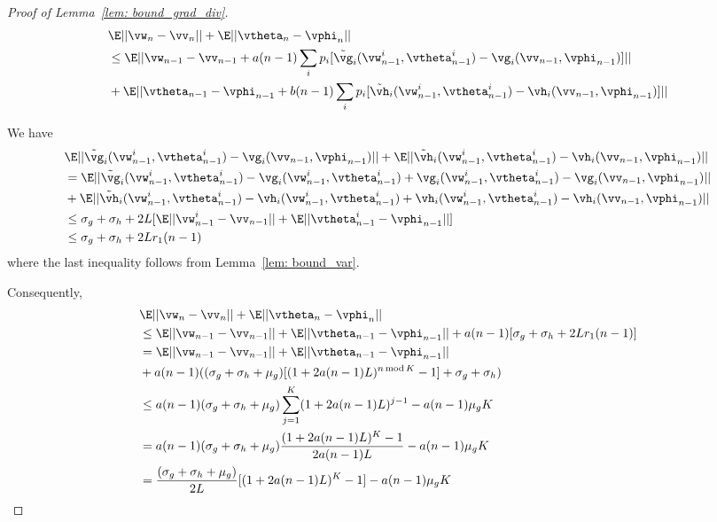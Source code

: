 \documentclass{article}
\def\lemref#1{Lemma~\ref{#1}}
\begin{document}
\begin{proof}[Proof of \lemref{lem: bound_grad_div}]
		\begin{equation}
		\begin{split}
		&\E||{\vw}_{n}-\vv_{n}||+\E||{\vtheta}_{n}-\vphi_{n}||\\
		&\leq \E||{\vw}_{n-1}-\vv_{n-1}+a(n-1)\sum_i p_i [\tilde{\vg}_i(\vw^i_{n-1}, \vtheta^i_{n-1})-\vg_i(\vv_{n-1},\vphi_{n-1})]||\\
		&+ \E||{\vtheta}_{n-1}-\vphi_{n-1}+b(n-1)\sum_i p_i [\tilde{\vh}_i(\vw^i_{n-1}, \vtheta^i_{n-1})-\vh_i(\vv_{n-1},\vphi_{n-1})]||
		\end{split}
		\end{equation}
		
		We have
		\begin{equation}
		\begin{split}
		&\E||\tilde{\vg}_i(\vw^i_{n-1}, \vtheta^i_{n-1})-\vg_i(\vv_{n-1},\vphi_{n-1})||+\E||\tilde{\vh}_i(\vw^i_{n-1}, \vtheta^i_{n-1})-\vh_i(\vv_{n-1},\vphi_{n-1})||\\
		&=\E||\tilde{\vg}_i(\vw^i_{n-1}, \vtheta^i_{n-1})-\vg_i(\vw^i_{n-1}, \vtheta^i_{n-1})+\vg_i(\vw^i_{n-1}, \vtheta^i_{n-1})-\vg_i(\vv_{n-1},\vphi_{n-1})||\\
		&+\E||\tilde{\vh}_i(\vw^i_{n-1}, \vtheta^i_{n-1})-\vh_i(\vw^i_{n-1}, \vtheta^i_{n-1})+\vh_i(\vw^i_{n-1}, \vtheta^i_{n-1})-\vh_i(\vv_{n-1},\vphi_{n-1})||\\
		&\leq \sigma_g+\sigma_h+2L[\E||\vw^i_{n-1}-\vv_{n-1}||+\E||\vtheta^i_{n-1}-\vphi_{n-1}||]\\
		&\leq \sigma_g+\sigma_h+2L r_1(n-1)
		\end{split}
		\end{equation}
		where the last inequality follows from \lemref{lem: bound_var}. 
		
		Consequently,
		\begin{equation}
		\begin{split}
		&\E||{\vw}_{n}-\vv_{n}||+\E||{\vtheta}_{n}-\vphi_{n}|| \\
		&\leq \E||{\vw}_{n-1}-\vv_{n-1}||+\E||{\vtheta}_{n-1}-\vphi_{n-1}||+a(n-1) [\sigma_g+\sigma_h+2L r_1(n-1)]\\
		&=\E||{\vw}_{n-1}-\vv_{n-1}||+\E||{\vtheta}_{n-1}-\vphi_{n-1}||\\
		&+a(n-1)((\sigma_g+\sigma_h+\mu_g)[(1+2a(n-1)L)^{n\, \text{mod}\, K}-1]+\sigma_g+\sigma_h)\\
		&\leq a(n-1)(\sigma_g+\sigma_h+\mu_g)\sum_{j=1}^K (1+2a(n-1)L)^{j-1}-a(n-1)\mu_gK\\
		&=a(n-1)(\sigma_g+\sigma_h+\mu_g) \frac{(1+2a(n-1)L)^{K}-1}{2a(n-1)L}-a(n-1)\mu_gK\\
		&=\frac{(\sigma_g+\sigma_h+\mu_g)}{2L}[(1+2a(n-1)L)^{K}-1]-a(n-1)\mu_gK
		\end{split}
		\end{equation}
	\end{proof}
	
\end{document}
